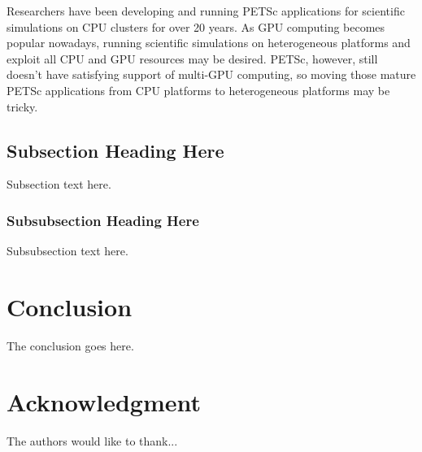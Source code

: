 \documentclass[conference]{IEEEtran}
\begin{document}
Researchers have been developing and running 
PETSc\cite{petsc-web-page, petsc-user-ref, petsc-efficient} 
applications for scientific simulations on CPU clusters for over 20 years.
As GPU computing becomes popular nowadays, 
running scientific simulations on heterogeneous platforms and exploit all CPU and GPU resources may be desired.
PETSc, however, still doesn't have satisfying support of multi-GPU computing,
so moving those mature PETSc applications from CPU platforms to heterogeneous platforms may be tricky.






\subsection{Subsection Heading Here}
Subsection text here.


\subsubsection{Subsubsection Heading Here}
Subsubsection text here.

\section{Conclusion}
The conclusion goes here.






\section*{Acknowledgment}


The authors would like to thank...







%
%
%


\end{document}
